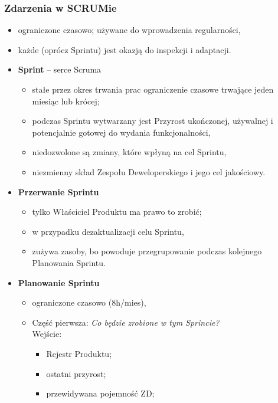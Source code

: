 \documentclass[a4paper]{article}
\begin{document}
    \subsubsection{Zdarzenia w SCRUMie}
    \begin{itemize}
        \item ograniczone czasowo; używane do wprowadzenia regularności,
        \item każde (oprócz Sprintu) jest okazją do inspekcji i adaptacji.
        \\
        \item \textbf{Sprint} – serce Scruma
        \begin{itemize}
            \item stałe przez okres trwania prac ograniczenie czasowe trwające jeden miesiąc lub krócej;
            \item podczas Sprintu wytwarzany jest Przyrost ukończonej,
            używalnej i potencjalnie gotowej do wydania funkcjonalności,
            \item niedozwolone są zmiany, które wpłyną na cel Sprintu,
            \item niezmienny skład Zespołu Deweloperskiego i jego cel jakościowy.
        \end{itemize}
        \item \textbf{Przerwanie Sprintu}
        \begin{itemize}
            \item tylko Właściciel Produktu ma prawo to zrobić;
            \item w przypadku dezaktualizacji celu Sprintu,
            \item zużywa zasoby, bo powoduje przegrupowanie podczas kolejnego Planowania
            Sprintu.
        \end{itemize}
        \item \textbf{Planowanie Sprintu}
        \begin{itemize}
            \item ograniczone czasowo (8h/mies),
            \item Część pierwsza: \textit{Co będzie zrobione w tym Sprincie?}\\
            Wejście:
            \begin{itemize}
                \item Rejestr Produktu;
                \item ostatni przyrost;
                \item przewidywana pojemność ZD;

\end{itemize}
\end{itemize}
\end{itemize}
\end{document}
